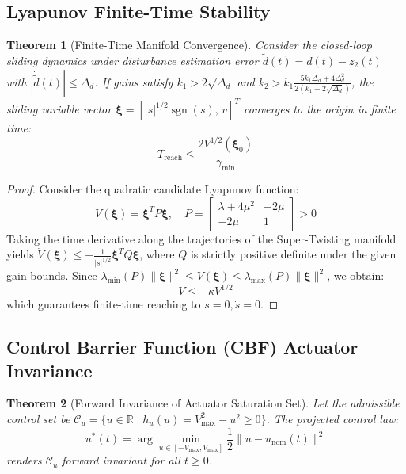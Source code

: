 \documentclass[journal,twocolumn,letterpaper]{IEEEtran}
\newtheorem{theorem}{Theorem}
\begin{document}
\subsection{Lyapunov Finite-Time Stability}

\begin{theorem}[Finite-Time Manifold Convergence]
Consider the closed-loop sliding dynamics under disturbance estimation error $\tilde{d}(t) = d(t) - z_2(t)$ with $|\dot{\tilde{d}}(t)| \le \Delta_d$. If gains satisfy $k_1 > 2\sqrt{\Delta_d}$ and $k_2 > k_1 \frac{5 k_1 \Delta_d + 4 \Delta_d^2}{2(k_1 - 2\sqrt{\Delta_d})}$, the sliding variable vector $\boldsymbol{\xi} = [|s|^{1/2}\operatorname{sgn}(s),\, v]^T$ converges to the origin in finite time:
\begin{equation}
T_{\text{reach}} \le \frac{2 V^{1/2}(\boldsymbol{\xi}_0)}{\gamma_{\min}}
\end{equation}
\end{theorem}

\begin{proof}
Consider the quadratic candidate Lyapunov function:
\begin{equation}
V(\boldsymbol{\xi}) = \boldsymbol{\xi}^T P \boldsymbol{\xi}, \quad P = \begin{bmatrix} \lambda + 4\mu^2 & -2\mu \\ -2\mu & 1 \end{bmatrix} > 0
\end{equation}
Taking the time derivative along the trajectories of the Super-Twisting manifold yields $\dot{V}(\boldsymbol{\xi}) \le -\frac{1}{|s|^{1/2}} \boldsymbol{\xi}^T Q \boldsymbol{\xi}$, where $Q$ is strictly positive definite under the given gain bounds. Since $\lambda_{\min}(P) \|\boldsymbol{\xi}\|^2 \le V(\boldsymbol{\xi}) \le \lambda_{\max}(P) \|\boldsymbol{\xi}\|^2$, we obtain:
\begin{equation}
\dot{V} \le -\kappa V^{1/2}
\end{equation}
which guarantees finite-time reaching to $s = 0, \dot{s} = 0$.
\end{proof}

\subsection{Control Barrier Function (CBF) Actuator Invariance}

\begin{theorem}[Forward Invariance of Actuator Saturation Set]
Let the admissible control set be $\mathcal{C}_u = \{u \in \mathbb{R} \mid h_u(u) = V_{\max}^2 - u^2 \ge 0\}$. The projected control law:
\begin{equation}
u^*(t) = \arg\min_{u \in [-V_{\max}, V_{\max}]} \frac{1}{2} \|u - u_{\text{nom}}(t)\|^2
\end{equation}
renders $\mathcal{C}_u$ forward invariant for all $t \ge 0$.
\end{theorem}
\end{document}
